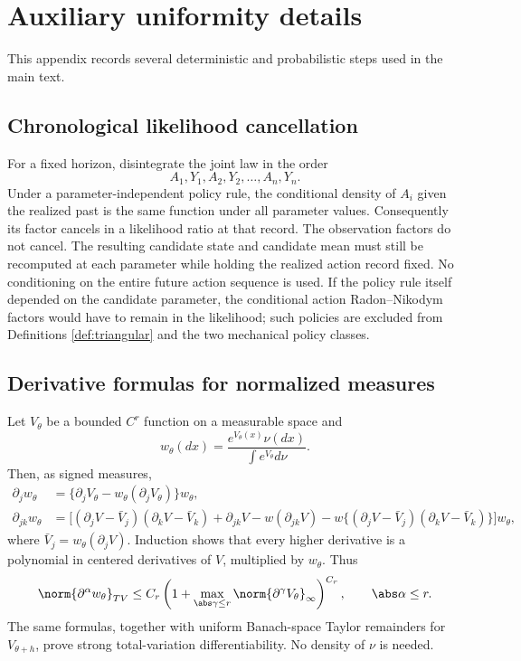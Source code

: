 
\section{Auxiliary uniformity details}
\label{app:uniformity}

This appendix records several deterministic and probabilistic steps used in
the main text.

\subsection{Chronological likelihood cancellation}

For a fixed horizon, disintegrate the joint law in the order
\[
 A_1,Y_1,A_2,Y_2,\ldots,A_n,Y_n.
\]
Under a parameter-independent policy rule, the conditional density of \(A_i\)
given the realized past is the same function under all parameter values.
Consequently its factor cancels in a likelihood ratio at that record.  The
observation factors do not cancel.  The resulting candidate state and
candidate mean must still be recomputed at each parameter while holding the
realized action record fixed.  No conditioning on the entire future action
sequence is used.  If the policy rule itself depended on the candidate
parameter, the conditional action Radon--Nikodym factors would have to remain
in the likelihood; such policies are excluded from Definitions
\ref{def:triangular} and the two mechanical policy classes.

\subsection{Derivative formulas for normalized measures}

Let \(V_\theta\) be a bounded \(C^r\) function on a measurable space and
\[
 w_\theta(dx)=
 \frac{e^{V_\theta(x)}\nu(dx)}{\int e^{V_\theta}d\nu}.
\]
Then, as signed measures,
\begin{align*}
 \partial_jw_\theta
 &=\{\partial_jV_\theta-
       w_\theta(\partial_jV_\theta)\}w_\theta,\\
 \partial_{jk}w_\theta
 &=\bigl[(\partial_jV-\bar V_j)(\partial_kV-\bar V_k)
   +\partial_{jk}V-w(\partial_{jk}V)
   -w\{(\partial_jV-\bar V_j)(\partial_kV-\bar V_k)\}\bigr]w_\theta,
\end{align*}
where \(\bar V_j=w_\theta(\partial_jV)\).  Induction shows that every
higher derivative is a polynomial in centered derivatives of \(V\),
multiplied by \(w_\theta\).  Thus
\[
 \norm{\partial^\alpha w_\theta}_{TV}
 \le C_r\left(1+\max_{\abs\gamma\le r}
 \norm{\partial^\gamma V_\theta}_\infty\right)^{C_r},
 \qquad \abs\alpha\le r.
\]
The same formulas, together with uniform Banach-space Taylor remainders for
\(V_{\theta+h}\), prove strong total-variation differentiability.  No density
of \(\nu\) is needed.

